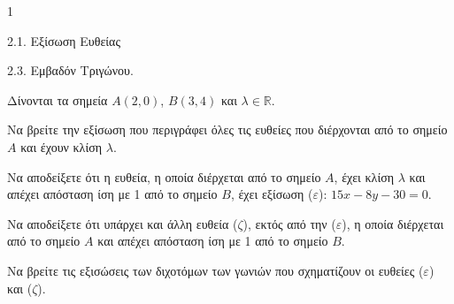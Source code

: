 \begin{ylh}{1}
    \item 2.1. Εξίσωση Ευθείας
    \item 2.3. Εμβαδόν Τριγώνου.
\end{ylh}
Δίνονται τα σημεία $A(2,0)$, $B(3,4)$ και $\lambda \in \mathbb{R}$.
\begin{alist}
\item
    \begin{rlist}
    \item Να βρείτε την εξίσωση που περιγράφει όλες τις ευθείες που διέρχονται από το σημείο $A$ και έχουν κλίση $\lambda$. 
    \item Να αποδείξετε ότι η ευθεία, η οποία διέρχεται από το σημείο $A$, έχει κλίση $\lambda$ και απέχει απόσταση ίση με 1 από το σημείο $B$, έχει εξίσωση ($\varepsilon$): $15x - 8y - 30 = 0$. 
    \end{rlist}
\item Να αποδείξετε ότι υπάρχει και άλλη ευθεία ($\zeta$), εκτός από την ($\varepsilon$), η οποία διέρχεται από το σημείο $A$ και απέχει απόσταση ίση με 1 από το σημείο $B$. 
\item Να βρείτε τις εξισώσεις των διχοτόμων των γωνιών που σχηματίζουν οι ευθείες ($\varepsilon$) και ($\zeta$). 
\end{alist}